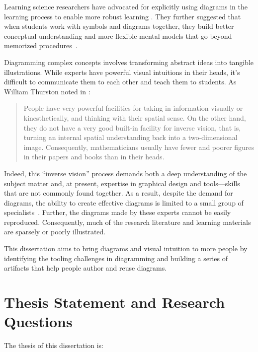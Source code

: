 \noindent Learning science researchers have advocated for explicitly using diagrams in the learning process to enable more robust learning \cite{mayer_multimedia_2002}. They further suggested that when students work with symbols and diagrams together, they build better conceptual understanding and more flexible mental models that go beyond memorized procedures~\cite{multipleReps,kellman_perceptual_2010,groundedFeedback}. 

Diagramming complex concepts involves transforming abstract ideas into tangible illustrations. While experts have powerful visual intuitions in their heads, it's difficult to communicate them to each other and teach them to students. As William Thurston noted in :

\begin{quote}
   People have very powerful facilities for taking in information visually or kinesthetically, and thinking with their spatial sense. On the other hand, they do not have a very good built-in facility for inverse vision, that is, turning an internal spatial understanding back into a two-dimensional image. Consequently, mathematicians usually have fewer and poorer figures in their papers and books than in their heads.~\cite[p. 164]{thurston_proof_1994}
\end{quote}

\noindent
Indeed, this ``inverse vision'' process demands both a deep understanding of the subject matter and, at present, expertise in graphical design and tools---skills that are not commonly found together. As a result, despite the demand for diagrams, the ability to create effective diagrams is limited to a small group of specialists~\cite{coulon_importance_2024}. Further, the diagrams made by these experts cannot be easily reproduced. Consequently, much of the research literature and learning materials are sparsely or poorly illustrated.

This dissertation aims to bring diagrams and visual intuition to more people by identifying the tooling challenges in diagramming and building a series of artifacts that help people author and reuse diagrams. 

\section{Thesis Statement and Research Questions}

The thesis of this dissertation is:


